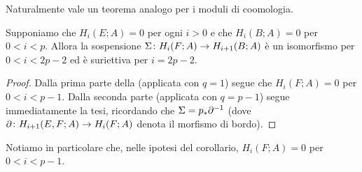 Naturalmente vale un teorema analogo per i moduli di coomologia.
\begin{corollary}
Supponiamo che $H_i(E;A)=0$ per ogni $i>0$ e che $H_i(B;A)=0$ per $0<i<p$. Allora la sospensione $\Sigma\colon H_i(F;A)\to H_{i+1}(B;A)$ è un isomorfismo per $0<i<2p-2$ ed è suriettiva per $i=2p-2$.
\end{corollary}
\begin{proof}
Dalla prima parte della  (applicata con $q=1$) segue che $H_i(F;A)=0$ per $0<i<p-1$. Dalla seconda parte (applicata con $q=p-1$) segue immediatamente la tesi, ricordando che $\Sigma=p_\ast\partial^{-1}$ (dove $\partial\colon H_{i+1}(E,F;A)\to H_i(F;A)$ denota il morfismo di bordo).
\end{proof}
Notiamo in particolare che, nelle ipotesi del corollario, $H_i(F;A)=0$ per $0<i<p-1$.
